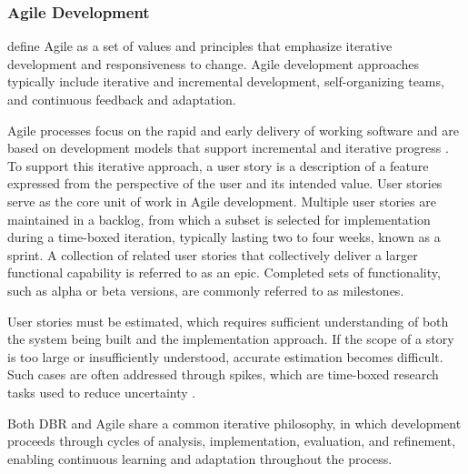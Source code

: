 \subsubsection{Agile Development}

\textcite{Beck2004XP} define Agile as a set of values and principles that emphasize iterative development and responsiveness to change. Agile development approaches typically include iterative and incremental development, self-organizing teams, and continuous feedback and adaptation.

Agile processes focus on the rapid and early delivery of working software and are based on development models that support incremental and iterative progress \parencite{keith2010agile}. To support this iterative approach, a user story is a description of a feature expressed from the perspective of the user and its intended value. User stories serve as the core unit of work in Agile development. Multiple user stories are maintained in a backlog, from which a subset is selected for implementation during a time-boxed iteration, typically lasting two to four weeks, known as a sprint. A collection of related user stories that collectively deliver a larger functional capability is referred to as an epic. Completed sets of functionality, such as alpha or beta versions, are commonly referred to as milestones.

User stories must be estimated, which requires sufficient understanding of both the system being built and the implementation approach. If the scope of a story is too large or insufficiently understood, accurate estimation becomes difficult. Such cases are often addressed through spikes, which are time-boxed research tasks used to reduce uncertainty \parencite{keith2010agile}.

Both DBR and Agile share a common iterative philosophy, in which development proceeds through cycles of analysis, implementation, evaluation, and refinement, enabling continuous learning and adaptation throughout the process.